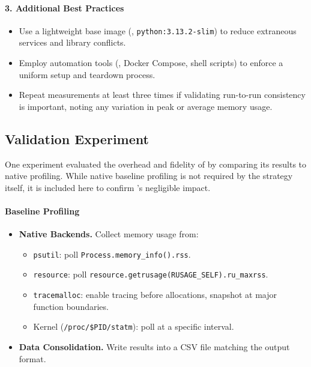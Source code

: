 \paragraph{3. Additional Best Practices}
\begin{itemize}
    \item Use a lightweight base image (\eg, \texttt{python:3.13.2-slim}) to reduce extraneous services and library conflicts.
    \item Employ automation tools (\eg, Docker Compose, shell scripts) to enforce a uniform setup and teardown process.
    \item Repeat measurements at least three times if validating run-to-run consistency is important, noting any variation in peak or average memory usage.
\end{itemize}

\subsection{Validation Experiment}
\label{subsec:validation-experiment}

One experiment evaluated the overhead and fidelity of \traceq by comparing its results to native profiling.
While native baseline profiling is not required by the strategy itself, it is included here to confirm \traceq’s negligible impact.

\paragraph{Baseline Profiling}
\begin{itemize}

    \item \textbf{Native Backends.} Collect memory usage from:
    \begin{itemize}
        \item \texttt{psutil}: poll \texttt{Process.memory\_info().rss}.
        \item \texttt{resource}: poll \texttt{resource.getrusage(RUSAGE\_SELF).ru\_maxrss}.
        \item \texttt{tracemalloc}: enable tracing before allocations, snapshot at major function boundaries.
        \item Kernel (\texttt{/proc/\$PID/statm}): poll at a specific interval.
    \end{itemize}

    \item \textbf{Data Consolidation.} Write results into a \ac{CSV} file matching the \traceq output format.

\end{itemize}

